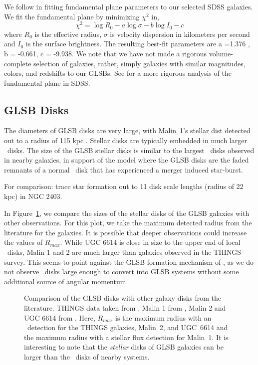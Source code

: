 \documentclass[12pt,preprint]{aastex}
\newcommand\HI{\ion{H}{1}}
\begin{document}
We follow \citet{Bernardi03,Bernardi03b} in fitting fundamental plane parameters to our selected SDSS galaxies.  We fit the fundamental plane by minimizing $\chi^2$ in, 
\begin{equation}
\chi^2 = \log R_0 - a \log \sigma - b \log I_0 - c
\end{equation}
where $R_0$ is the effective radius, $\sigma$ is velocity dispersion in kilometers per second and $I_0$ is the surface brightness.  The resulting best-fit parameters are  a =1.376 , b = -0.661, c = -9.938.  We note that we have not made a rigorous volume-complete selection of galaxies, rather, simply galaxies with similar magnitudes, colors, and redshifts to our GLSBs.   See \citet{Saulder13} for a more rigorous analysis of the fundamental plane in SDSS. 


\subsection{GLSB Disks}


The diameters of GLSB disks are very large, with Malin~1's stellar dist detected out to a radius of 115 kpc \citep{Moore06}.  Stellar disks are typically embedded in much larger \HI\ disks.  The size of the GLSB stellar disks is similar to the largest \HI\ disks observed in nearby galaxies, in support of the \citet{Mapelli08} model where the GLSB disks are the faded remnants of a normal \HI\ disk that has experienced a merger induced star-burst.  



For comparison:  \citet{Williams13} trace star formation out to 11 disk scale lengths (radius of 22 kpc) in NGC 2403.  


In Figure~\ref{disk_comp}, we compare the sizes of the stellar disks of the GLSB galaxies with other observations.  For this plot, we take the maximum detected radius from the literature for the galaxies.  It is possible that deeper observations could increase the values of $R_{max}$.  While UGC 6614 is close in size to the upper end of local \HI\ disks, Malin 1 and 2 are much larger than galaxies observed in the THINGS survey.  This seems to point against the GLSB formation mechanism of  \citet{Mapelli08}, as we do not observe \HI\ disks large enough to convert into GLSB systems without some additional source of angular momentum.

\begin{figure}
\caption{ Comparison of the GLSB disks with other galaxy disks from the literature.  THINGS data taken from \citet{DeBlok2008}, Malin 1 from \citet{Moore06}, Malin 2 and UGC 6614 from \citet{Pickering97}.  Here, $R_{max}$ is the maximum radius with an \HI\ detection for the THINGS galaxies, Malin~2, and UGC~6614 and the maximum radius with a stellar flux detection for Malin~1.  It is interesting to note that the \emph{stellar} disks of GLSB galaxies can be larger than the \HI\ disks of nearby systems.  \label{disk_comp}}
\end{figure}
\end{document}
